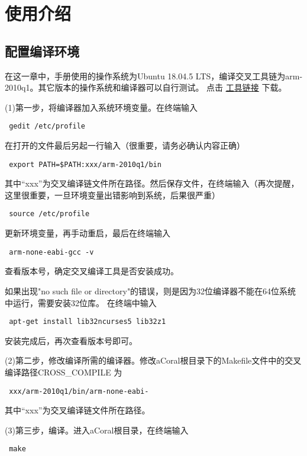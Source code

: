 \chapter{使用介绍}
\section{配置编译环境}

在这一章中，手册使用的操作系统为Ubuntu 18.04.5 LTS，编译交叉工具链为arm-2010q1。其它版本的操作系统和编译器可以自行测试。
点击 \href{https://github.com/spg-one/aCoral1-Tools}{\underline{工具链接}} 下载。

(1)第一步，将编译器加入系统环境变量。在终端输入
\begin{lstlisting}
 gedit /etc/profile   
\end{lstlisting}

在打开的文件最后另起一行输入（很重要，请务必确认内容正确）
\begin{lstlisting}
 export PATH=$PATH:xxx/arm-2010q1/bin  
\end{lstlisting}

其中“xxx”为交叉编译链文件所在路径。然后保存文件，在终端输入（再次提醒，这里很重要，一旦环境变量出错影响到系统，后果很严重）
\begin{lstlisting}
 source /etc/profile
\end{lstlisting}

更新环境变量，再手动重启，最后在终端输入
\begin{lstlisting}
 arm-none-eabi-gcc -v
\end{lstlisting}

查看版本号，确定交叉编译工具是否安装成功。

如果出现"no such file or directory"的错误，则是因为32位编译器不能在64位系统中运行，需要安装32位库。
在终端中输入
\begin{lstlisting}
 apt-get install lib32ncurses5 lib32z1
\end{lstlisting}

安装完成后，再次查看版本号即可。

(2)第二步，修改编译所需的编译器。修改aCoral根目录下的Makefile文件中的交叉编译路径CROSS\_COMPILE 为
\begin{lstlisting}
 xxx/arm-2010q1/bin/arm-none-eabi-
\end{lstlisting}

其中“xxx”为交叉编译链文件所在路径。

(3)第三步，编译。进入aCoral根目录，在终端输入
\begin{lstlisting}
 make
\end{lstlisting}

